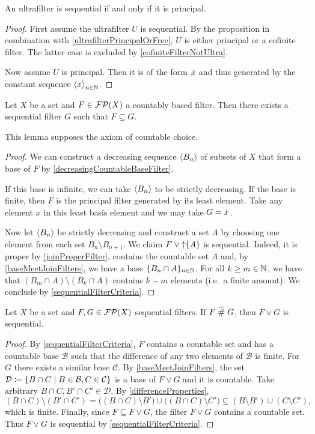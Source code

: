 \begin{corollary}
An ultrafilter is sequential \textup{if and only if} it is principal.
\end{corollary}
\begin{proof}
First assume the ultrafilter $U$ is sequential. By the proposition in combination with \ref{ultrafilterPrincipalOrFree}, $U$ is either principal or a cofinite filter. The latter case is excluded by \ref{cofiniteFilterNotUltra}.

Now assume $U$ is principal. Then it is of the form $\dot{x}$ and thus generated by the constant sequence $\left\langle x \right\rangle_{n\in \mathbb{N}}$.
\end{proof}

\begin{lemma} \label{countablyBasedFilterHasFinerSequential}
Let $X$ be a set and $F\in\operatorname{\mathcal{FP}}(X)$ a countably based filter. Then there exists a sequential filter $G$ such that $F\subseteq G$.
\end{lemma}
This lemma supposes the axiom of countable choice.
\begin{proof}
We can construct a decreasing sequence $\left\langle B_n \right\rangle$ of subsets of $X$ that form a base of $F$ by \ref{decreasingCountableBaseFilter}.

If this base is infinite, we can take $\left\langle B_n \right\rangle$ to be strictly decreasing. If the base is finite, then $F$ is the principal filter generated by its least element. Take any element $x$ in this least basis element and we may take $G = \dot{x}$.

Now let $\left\langle B_n \right\rangle$ be strictly decreasing and construct a set $A$ by choosing one element from each set $B_n\setminus B_{n+1}$. We claim $F\vee \operatorname{\uparrow}\{A\}$ is sequential. Indeed, it is proper by \ref{joinProperFilter}, contains the countable set $A$ and, by \ref{baseMeetJoinFilters}, we have a base $\{B_n\cap A\}_{n\in \mathbb{N}}$. 
For all $k\geq m\in \mathbb{N}$, we have that $(B_m\cap A)\setminus (B_k\cap A)$ contains $k-m$ elements (i.e.\ a finite amount).
We conclude by \ref{sequentialFilterCriteria}.
\end{proof}

\begin{proposition}
Let $X$ be a set and $F,G\in\operatorname{\mathcal{FP}}(X)$ sequential filters. If $F\mathrel{\widehat{\#}} G$, then $F\vee G$ is sequential.
\end{proposition}
\begin{proof}
By \ref{sequentialFilterCriteria}, $F$ contains a countable set and has a countable base $\mathcal{B}$ such that the difference of any two elements of $\mathcal{B}$ is finite. For $G$ there exists a similar base $\mathcal{C}$. By \ref{baseMeetJoinFilters}, the set $\mathcal{D} \defeq \setbuilder{B\cap C}{B\in\mathcal{B}, C\in\mathcal{C}}$ is a base of $F\vee G$ and it is countable. Take arbitrary $B\cap C, B'\cap C'\in \mathcal{D}$.
By \ref{differenceProperties},
\[ (B\cap C)\setminus(B'\cap C') = \big((B\cap C)\setminus B'\big) \cup \big((B\cap C)\setminus C'\big) \subseteq (B\setminus B') \cup (C\setminus C'), \]
which is finite. Finally, since $F\subseteq F\vee G$, the filter $F\vee G$ contains a countable set. Thus $F\vee G$ is sequential by \ref{sequentialFilterCriteria}.
\end{proof}

